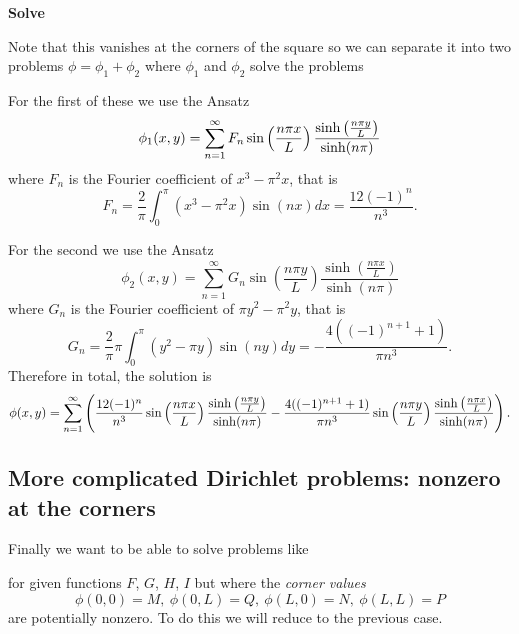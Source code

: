 \begin{exm}\label{exm:bdryprobl}
{\bf Solve}


Note that this vanishes at the corners of the square so we can separate it into two problems $\phi=\phi_1+\phi_2$ where $\phi_1$ and $\phi_2$ solve the problems



For the first of these we use the Ansatz
\[\phi_1(x,y)=\sum_{n=1}^{\infty}F_n\sin\left(\frac{n \pi x}{L}\right)\frac{\sinh\left(\frac{n\pi y}{L}\right)}{\sinh(n\pi)}\]
where $F_n$ is the Fourier coefficient of $x^3-\pi^2 x$, that is
\[F_n=\frac{2}{\pi}\int_0^{\pi}(x^3-\pi^2x)\sin(nx)dx=\frac{12(-1)^n}{n^3}.\]

For the second we use the Ansatz
\[\phi_2(x,y)=\sum_{n=1}^{\infty}G_n\sin\left(\frac{n\pi y}{L}\right)\frac{\sinh\left(\frac{n\pi x}{L}\right)}{\sinh(n\pi)}\]
where $G_n$ is the Fourier coefficient of $\pi y^2-\pi^2y$, that is
\[G_n=\frac{2}{\pi}\pi\int_0^{\pi}(y^2-\pi y)\sin(ny)dy=-\frac{4((-1)^{n+1}+1)}{\pi n^3}.\]
Therefore in total, the solution is
\[\phi(x,y)=\sum_{n=1}^{\infty}\left(\frac{12(-1)^n}{n^3}\sin\left(\frac{n \pi x}{L}\right)\frac{\sinh\left(\frac{n\pi y}{L}\right)}{\sinh(n\pi)}-\frac{4((-1)^{n+1}+1)}{\pi n^3}\sin\left(\frac{n\pi y}{L}\right)\frac{\sinh\left(\frac{n\pi x}{L}\right)}{\sinh(n\pi)}\right).\]
\end{exm}

\subsection{More complicated Dirichlet problems: nonzero at the corners}

Finally we want to be able to solve problems like


for given functions $F$, $G$, $H$, $I$ but where the {\em corner values}
\[\phi(0,0)=M,\ \phi(0,L)=Q,\ \phi(L,0)=N,\ \phi(L,L)=P\]
are potentially nonzero. To do this we will reduce to the previous case.

